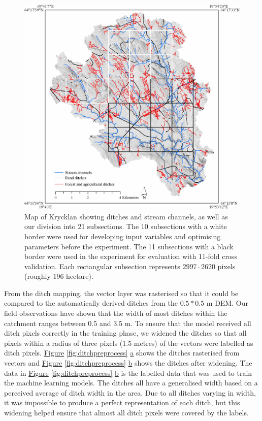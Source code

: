 \documentclass[]{interact}
\theoremstyle{plain}%
\theoremstyle{definition}
\theoremstyle{remark}
\begin{document}
\begin{figure}
    \centering
    \includegraphics[width=1\linewidth]{./images/Krycklan_lo.jpg}
    \caption{Map of Krycklan showing ditches and stream channels, as well as our division into 21 subsections. The 10 subsections with a white border were used for developing input variables and optimising parameters before the experiment. The 11 subsections with a black border were used in the experiment for evaluation with 11-fold cross validation. Each rectangular subsection represents $2997 \cdot 2620$ pixels (roughly 196 hectare).}
    \label{fig:swedenkrycklan}
\end{figure}

From the ditch mapping, the vector layer was rasterised so that it could be compared to the automatically derived ditches from the $0.5*0.5$ m DEM. Our field observations have shown that the  width of most ditches within the catchment ranges between 0.5 and 3.5 m. To ensure that the model received all ditch pixels correctly in the training phase, we widened the ditches so that all pixels within a radius of three pixels (1.5 metres) of the vectors were labelled as ditch pixels. \hyperref[fig:ditchpreprocess]{Figure} \ref{fig:ditchpreprocess} \hyperref[fig:ditchpreprocess]{a} shows the ditches rasterised from vectors and \hyperref[fig:ditchpreprocess]{Figure} \ref{fig:ditchpreprocess} \hyperref[fig:ditchpreprocess]{b} shows the ditches after widening. The data in \hyperref[fig:ditchpreprocess]{Figure} \ref{fig:ditchpreprocess} \hyperref[fig:ditchpreprocess]{b} is the labelled data that was used to train the machine learning models. The ditches all have a generalised width based on a perceived average of ditch width in the area. Due to all ditches varying in width, it was impossible to produce a perfect representation of each ditch, but this widening helped ensure that almost all ditch pixels were covered by the labels.
\end{document}
